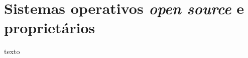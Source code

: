 \section{Sistemas operativos \textit{open source} e proprietários} \label{section: sistemas operativos}
texto